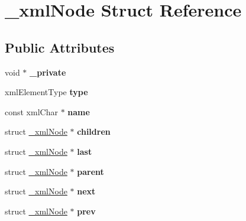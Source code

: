 \hypertarget{struct__xmlNode}{
\section{\_\-xmlNode Struct Reference}
\label{struct__xmlNode}
}
\subsection*{Public Attributes}
\begin{DoxyCompactItemize}
\item 
\hypertarget{struct__xmlNode_a2872be79ee1c9154643d123e96766d4c}{
void $\ast$ {\bfseries \_\-private}}
\label{struct__xmlNode_a2872be79ee1c9154643d123e96766d4c}

\item 
\hypertarget{struct__xmlNode_acdcf66240b9c7959ff5ff4221ef725b4}{
xmlElementType {\bfseries type}}
\label{struct__xmlNode_acdcf66240b9c7959ff5ff4221ef725b4}

\item 
\hypertarget{struct__xmlNode_a8629b4d6c8ca0cf48a4104e5546bf06d}{
const xmlChar $\ast$ {\bfseries name}}
\label{struct__xmlNode_a8629b4d6c8ca0cf48a4104e5546bf06d}

\item 
\hypertarget{struct__xmlNode_a35263b67ca130530ea776e8e3e5f25ae}{
struct \hyperlink{struct__xmlNode}{\_\-xmlNode} $\ast$ {\bfseries children}}
\label{struct__xmlNode_a35263b67ca130530ea776e8e3e5f25ae}

\item 
\hypertarget{struct__xmlNode_ac8f70a320c5a645a77f80d83d690d059}{
struct \hyperlink{struct__xmlNode}{\_\-xmlNode} $\ast$ {\bfseries last}}
\label{struct__xmlNode_ac8f70a320c5a645a77f80d83d690d059}

\item 
\hypertarget{struct__xmlNode_ad6cfdc4df4af5288af3e5f0ec6eb8f25}{
struct \hyperlink{struct__xmlNode}{\_\-xmlNode} $\ast$ {\bfseries parent}}
\label{struct__xmlNode_ad6cfdc4df4af5288af3e5f0ec6eb8f25}

\item 
\hypertarget{struct__xmlNode_a3c5c796cc508a8c57f9dfb87326be2c7}{
struct \hyperlink{struct__xmlNode}{\_\-xmlNode} $\ast$ {\bfseries next}}
\label{struct__xmlNode_a3c5c796cc508a8c57f9dfb87326be2c7}

\item 
\hypertarget{struct__xmlNode_ae6a5ad30b68f25b84c4a2a7baf4d1b2d}{
struct \hyperlink{struct__xmlNode}{\_\-xmlNode} $\ast$ {\bfseries prev}}
\label{struct__xmlNode_ae6a5ad30b68f25b84c4a2a7baf4d1b2d}


\end{DoxyCompactItemize}
